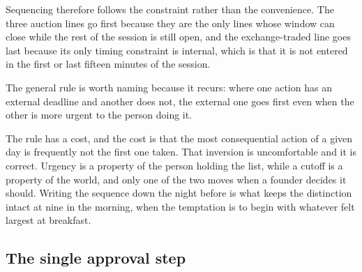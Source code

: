 Sequencing therefore follows the constraint rather than the convenience. The
three auction lines go first because they are the only lines whose window can
close while the rest of the session is still open, and the exchange-traded line
goes last because its only timing constraint is internal, which is that it is not
entered in the first or last fifteen minutes of the session.

The general rule is worth naming because it recurs: where one action has an
external deadline and another does not, the external one goes first even when the
other is more urgent to the person doing it.

The rule has a cost, and the cost is that the most consequential action of a
given day is frequently not the first one taken. That inversion is uncomfortable
and it is correct. Urgency is a property of the person holding the list, while a
cutoff is a property of the world, and only one of the two moves when a founder
decides it should. Writing the sequence down the night before is what keeps the
distinction intact at nine in the morning, when the temptation is to begin with
whatever felt largest at breakfast.

\subsection{The single approval step}

